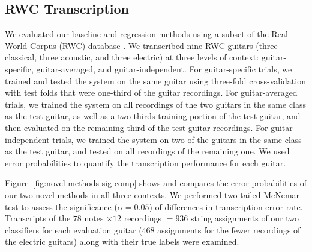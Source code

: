 \documentclass[convention,peer-reviewed]{aesconf}
\begin{document}
\subsection{RWC Transcription}
We evaluated our baseline and regression methods using a subset of the Real World Corpus (RWC) database \citep{goto2003}. We transcribed nine RWC guitars (three classical, three acoustic, and three electric) at three levels of context: guitar-specific, guitar-averaged, and guitar-independent. For guitar-specific trials, we trained and tested the system on the same guitar using three-fold cross-validation with test folds that were one-third of the guitar recordings. For guitar-averaged trials, we trained the system on all recordings of the two guitars in the same class as the test guitar, as well as a two-thirds training portion of the test guitar, and then evaluated on the remaining third of the test guitar recordings. For guitar-independent trials, we trained the system on two of the guitars in the same class as the test guitar, and tested on all recordings of the remaining one. We used error probabilities to quantify the transcription performance for each guitar.

Figure~\ref{fig:novel-methods-sig-comp} shows and compares the error probabilities of our two novel methods in all three contexts. We performed two-tailed McNemar test to assess the significance ($\alpha = 0.05$) of differences in transcription error rate. Transcripts of the $78$ notes $\times 12$ recordings $= 936$ string assignments of our two classifiers for each evaluation guitar ($468$ assignments for the fewer recordings of the electric guitars) along with their true labels were examined.
\end{document}
